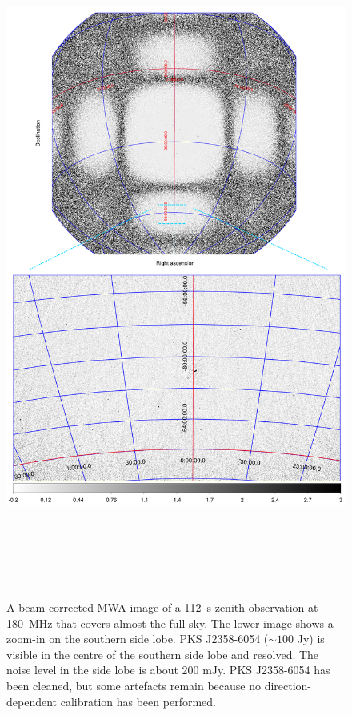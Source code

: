 \documentclass[useAMS,usenatbib]{mn2e}
\begin{document}
\begin{figure}
\begin{center}
\includegraphics[height=22.5cm]{img/fullsky-together}
\caption{A beam-corrected MWA image of a 112~s zenith observation at 180~MHz that covers almost the full sky. The lower image shows a zoom-in on the southern side lobe. PKS J2358-6054 ($\sim100$ Jy) is visible in the centre of the southern side lobe and resolved. The noise level in the side lobe is about 200 mJy. PKS J2358-6054 has been cleaned, but some artefacts remain because no direction-dependent calibration has been performed.}
\label{fig:full-sky-example}
\end{center}
\end{figure}
\end{document}
